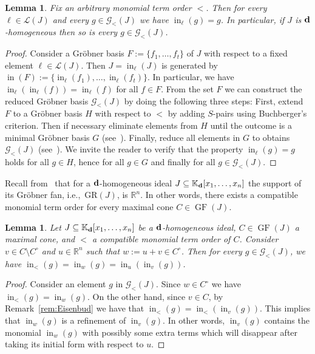 \documentclass[10pt,a4paper]{amsart}
\newcommand{\thlabel}[1]{\label{#1}}
\newtheorem{Lemma}[Theorem]{Lemma}
\numberwithin{equation}{section}
\DeclareMathOperator{\init}{in}
\DeclareMathOperator{\GF}{GF}
\begin{document}
\begin{Lemma}\thlabel{lem:init ell}
Fix an arbitrary monomial term order $<$. Then for every $\ell \in \mathcal L(J)$ and every $g\in \mathcal G_<(J)$ we have $\init_\ell(g)=g$.
In particular, if $J$ is ${\bf d}$-homogeneous then so is every $g\in \mathcal G_<(J)$.
\end{Lemma}
\begin{proof}
Consider a Gr\"obner basis $F:=\{f_1,\dots,f_t\}$ of $J$ with respect to a fixed element \mbox{$\ell\in\mathcal L(J)$}.
Then $J=\init_{\ell}(J)$ is generated by $\init(F):=\{\init_{\ell}(f_1),\dots,\init_\ell(f_t)\}$.
In particular, we have $\init_{\ell}(\init_{\ell}(f))=\init_\ell(f)$ for all $f\in F$.
From the set $F$ we can construct the reduced Gr\"obner basis $\mathcal G_<(J)$ by doing the following three steps:
First, extend $F$ to a Gr\"obner basis $H$ with res\-pect to $<$ by adding $S$-pairs using Buchberger's criterion.
Then if necessary eliminate elements from $H$ until the outcome is a minimal Gr\"obner basis $G$ (see~\cite[Corollary 1.8.3]{loustaunau1994introduction}).
Finally, reduce all elements in $G$ to obtains $\mathcal G_<(J)$ (see~\cite[Corollary 1.8.6]{loustaunau1994introduction}).
We invite the reader to verify that the property $\init_\ell(g)=g$ holds for all $g\in H$, hence for all $g\in G$ and finally for all $g\in \mathcal G_<(J)$.
\end{proof}

Recall from~\cite[Corollary 5.7]{mora1988grobner} that for a ${\bf d}$-homogeneous ideal $J\subseteq \mathbb K_{\bf d}[x_1, \dots , x_n]$ the support of its Gr\"obner fan, i.e.,~$\text{GR}(J)$, is $\mathbb R^n$. In other words, there exists a compatible monomial term order for every maximal cone $C\in \GF(J)$.

\begin{Lemma}\thlabel{lem:facet}
Let $J\subseteq \mathbb K_{\bf d}[x_1, \dots , x_n]$ be a ${\bf d}$-homogeneous ideal, $C\in\GF(J)$ a maximal cone, and $<$ a compatible monomial term order of $C$.
Consider $v\in C\setminus C^\circ$ and $u\in\mathbb{R}^n$ such that $w:=u+v\in C^\circ$. Then for every $g\in\mathcal{G}_<(J)$, we have $\init_<(g)=\init_{w}(g)=\init_u(\init_v(g))$.
\end{Lemma}
\begin{proof}
Consider an element $g$ in $\mathcal{G}_<(J)$. Since $w\in C^\circ$ we have $\init_<(g)=\init_{w}(g)$. On the other hand, since $v\in C$, by Remark~\ref{rem:Eisenbud} we have that $\init_<(g)=\init_{<}(\init_{v}(g))$.
This implies that $\init_{w}(g)$ is a refinement of $\init_{v}(g)$.
In other words, $\init_{v}(g)$ contains the monomial $\init_{w}(g)$ with possibly some extra terms which will disappear after taking its initial form with respect to $u$.
\end{proof}
\end{document}

